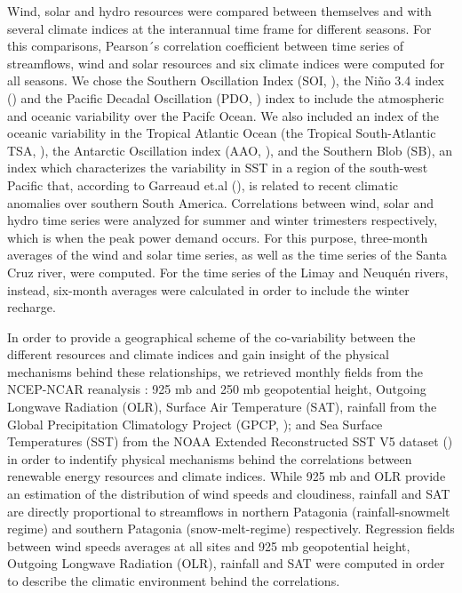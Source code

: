 \documentclass[AMA,Times1COL]{WileyNJDv5} %
\begin{document}
\begin{linenumbers}
Wind, solar and hydro resources were compared between themselves and with several climate indices at the interannual time frame for different seasons. For this comparisons, Pearson´s correlation coefficient between time series of streamflows, wind and solar resources and six climate indices were computed for all seasons. We chose the Southern Oscillation Index (SOI, \cite{ropelewski1987extension}), the Niño 3.4 index (\cite{rayner2003global}) and the Pacific Decadal Oscillation (PDO, \cite{mantua1997pacific}) index to include the atmospheric and oceanic variability over the Pacifc Ocean.  We also included an index of the oceanic variability in the Tropical Atlantic Ocean (the Tropical South-Atlantic TSA, \cite{enfield1999ubiquitous}), the Antarctic Oscillation index (AAO, \cite{mo2000relationships}), and the Southern Blob (SB), an index which characterizes the variability in SST in a region of the south-west Pacific that, according to Garreaud et.al (\cite{garreaud2021south}), is related to recent climatic anomalies over southern South America. Correlations between wind, solar and hydro time series were analyzed for summer and winter trimesters respectively, which is when the peak power demand occurs. For this purpose, three-month averages of the wind and solar time series, as well as the time series of the Santa Cruz river, were computed. For the time series of the Limay and Neuquén rivers, instead, six-month averages were calculated in order to include the winter recharge.

In order to provide a geographical scheme of the co-variability between the different resources and climate indices and gain insight of the physical mechanisms behind these relationships, we retrieved monthly fields from the NCEP-NCAR reanalysis \cite{kalnay2018ncep}: 925 mb and 250 mb geopotential height, Outgoing Longwave Radiation (OLR), Surface Air Temperature (SAT), rainfall from the Global Precipitation Climatology Project (GPCP, \cite{adler2003version}); and Sea Surface Temperatures (SST) from the NOAA Extended Reconstructed SST V5 dataset (\cite{huang2017noaa}) in order to indentify physical mechanisms behind the correlations between renewable energy resources and climate indices. While 925 mb and OLR provide an estimation of the distribution of wind speeds and cloudiness, rainfall and SAT are directly proportional to streamflows in northern Patagonia (rainfall-snowmelt regime) and southern Patagonia (snow-melt-regime) respectively. Regression fields between wind speeds averages at all sites and 925 mb geopotential height, Outgoing Longwave Radiation (OLR), rainfall and SAT were computed in order to describe the climatic environment behind the correlations.


\end{linenumbers}
\end{document}
